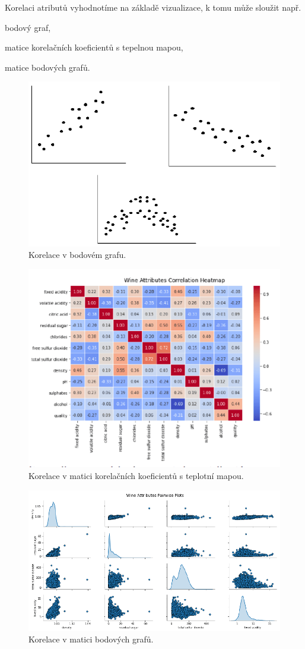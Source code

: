 \begin{compactitem}
    \item Korelaci atributů vyhodnotíme na základě vizualizace, k tomu může sloužit např. \begin{compactitem}
        \item bodový graf,
        \item matice korelačních koeficientů s tepelnou mapou,
        \item matice bodových grafů.
    \end{compactitem}
\end{compactitem}

\begin{figure}[H]
    \centering
    \includegraphics[width=0.5\linewidth]{korelace_bodovy_graf.png}
    \caption{Korelace v bodovém grafu.}
\end{figure}

\begin{figure}[H]
    \centering
    \includegraphics[width=0.8\linewidth]{korelace_teplotni_mapa.png}
    \caption{Korelace v matici korelačních koeficientů s teplotní mapou.}
\end{figure}

\begin{figure}[H]
    \centering
    \includegraphics[width=1\linewidth]{korelace_matice.png}
    \caption{Korelace v matici bodových grafů.}
\end{figure}
